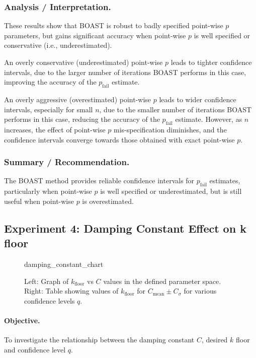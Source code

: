     \subsubsection{Analysis / Interpretation.}

    These results show that BOAST is robust to badly specified point-wise $p$ parameters, but gains significant accuracy when point-wise $p$ is well specified or conservative (i.e., underestimated).

    An overly conservative (underestimated) point-wise $p$ leads to tighter confidence intervals, due to the larger number of iterations BOAST performs in this case, improving the accuracy of the $p_\text{fail}$ estimate.

    An overly aggressive (overestimated) point-wise $p$ leads to wider confidence intervals, especially for small $n$, due to the smaller number of iterations BOAST performs in this case, reducing the accuracy of the $p_\text{fail}$ estimate. However, as $n$ increases, the effect of point-wise $p$ mis-specification diminishes, and the confidence intervals converge towards those obtained with exact point-wise $p$.

    \subsubsection{Summary / Recommendation.}

    The BOAST method provides reliable confidence intervals for $p_\text{fail}$ estimates, particularly when point-wise $p$ is well specified or underestimated, but is still useful when point-wise $p$ is overestimated.

\subsection{Experiment 4: Damping Constant Effect on k floor}
\label{sec:damping_experiment1}

    \begin{figure}[ht!]
        \centering
        {damping_constant_chart}
        \caption{Left: Graph of $k_{\text{floor}}$ vs $C$ values in the defined parameter space. Right: Table showing values of $k_{\text{floor}}$ for $C_{\text{mean}} \pm C_{\sigma}$ for various confidence levels $q$.}
        \label{fig:graph_table}
    \end{figure}

    \paragraph{Objective.}
    To investigate the relationship between the damping constant $C$, desired $k$ floor and confidence level $q$.

